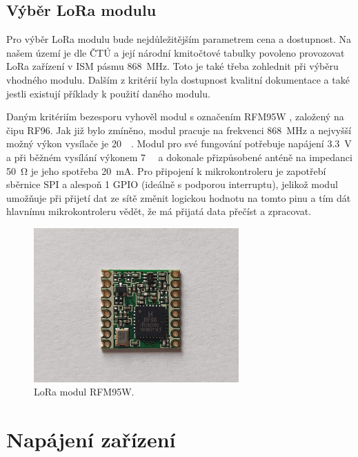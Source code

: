 \subsection{Výběr LoRa modulu}

Pro výběr LoRa modulu bude nejdůležitějším parametrem cena a dostupnost. Na našem území je dle ČTÚ a její národní kmitočtové tabulky\cite{kmitoctovaTabulka} povoleno provozovat LoRa zařízení v ISM pásmu \SI{868}{MHz}. Toto je také třeba zohlednit při výběru vhodného modulu. Dalším z kritérií byla dostupnost kvalitní dokumentace a také jestli existují příklady k použití daného modulu.

\DeclareSIUnit {}   %
Daným kritériím bezesporu vyhověl modul s označením RFM95W \cite{dat_RFM95W}, založený na čipu RF96. Jak již bylo zmíněno, modul pracuje na frekvenci \SI{868}{\mega\hertz} a nejvyšší možný výkon vysílače je \SI{20}{\deci\belm}. Modul pro své fungování potřebuje napájení \SI{3,3}{\volt} a při běžném vysílání výkonem \SI{+7}{\deci\belm} a dokonale přizpůsobené anténě na impedanci \SI{50}{\ohm} je jeho spotřeba \SI{20}{\milli\ampere}. Pro připojení k mikrokontroleru je zapotřebí sběrnice SPI a alespoň 1 GPIO (ideálně s podporou interruptu), jelikož modul umožňuje při přijetí dat ze sítě změnit logickou hodnotu na tomto pinu a tím dát hlavnímu mikrokontroleru vědět, že má přijatá data přečíst a zpracovat. 

\begin{figure}
    \centering
    \includegraphics[width=0.7\textwidth]{obrazky/rfm95w.jpg}
    \caption{LoRa modul RFM95W.}
    \label{fig_RFM95W}
\end{figure}

\section{Napájení zařízení}

